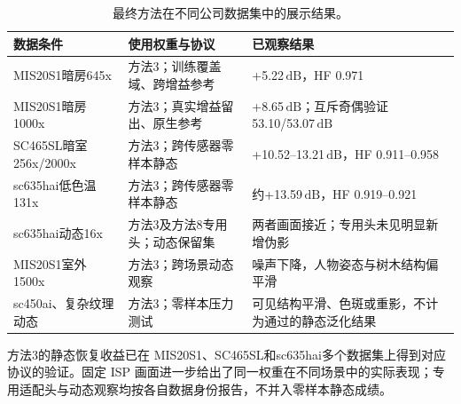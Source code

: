 \documentclass[11pt,a4paper,UTF8,fontset=fandol]{ctexart}
\newcommand{\db}{\ensuremath{\,\mathrm{dB}}}
\begin{document}
\begin{table}[H]
\centering\small
\caption{最终方法在不同公司数据集中的展示结果。}
\label{tab:result_scope}
\begin{tabular}{p{}p{}p{}}
\toprule
数据条件 & 使用权重与协议 & 已观察结果 \\
\midrule
MIS20S1暗房645x & 方法3；训练覆盖域、跨增益参考 & +5.22\db，HF 0.971 \\
MIS20S1暗房1000x & 方法3；真实增益留出、原生参考 & +8.65\db；互斥奇偶验证53.10/53.07\db \\
SC465SL暗室256x/2000x & 方法3；跨传感器零样本静态 & +10.52--13.21\db，HF 0.911--0.958 \\
sc635hai低色温131x & 方法3；跨传感器零样本静态 & 约+13.59\db，HF 0.919--0.921 \\
sc635hai动态16x & 方法3及方法8专用头；动态保留集 & 两者画面接近；专用头未见明显新增伪影 \\
MIS20S1室外1500x & 方法3；跨场景动态观察 & 噪声下降，人物姿态与树木结构偏平滑 \\
sc450ai、复杂纹理动态 & 方法3；零样本压力测试 & 可见结构平滑、色斑或重影，不计为通过的静态泛化结果 \\
\bottomrule
\end{tabular}
\end{table}

方法3的静态恢复收益已在 MIS20S1、SC465SL和sc635hai多个数据集上得到对应协议的验证。固定 ISP 画面进一步给出了同一权重在不同场景中的实际表现；专用适配头与动态观察均按各自数据身份报告，不并入零样本静态成绩。

\clearpage
\end{document}
